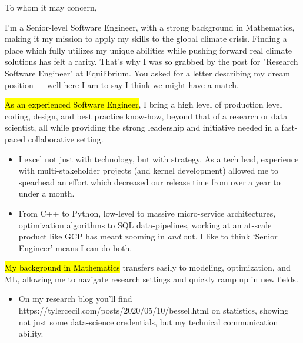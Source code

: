\documentclass{tc_cv}
\begin{document}

\begin{adjustwidth}{38pt}{38pt}
  \large

  To whom it may concern,\par \medbreak

  \medbreak

  I'm a Senior-level Software Engineer, with a strong background in
  Mathematics, making it my mission to apply my skills to the global climate
  crisis. Finding a place which fully utilizes my unique abilities while
  pushing forward real climate solutions has felt a rarity. That's why I was so
  grabbed by the post for "Research Software Engineer" at Equilibrium. You
  asked for a letter describing my dream position --- well here I am to say I
  think we might have a match. \medbreak

  \hl{As an experienced Software Engineer}, I bring a high level of production
  level coding, design, and best practice know-how, beyond that of a research
  or data scientist, all while providing the strong leadership and initiative
  needed in a fast-paced collaborative setting.
  \begin{itemize}

    \item I excel not just with technology, but with strategy. As a tech lead,
      experience with multi-stakeholder projects (and kernel development)
      allowed me to spearhead an effort which decreased our release time from
      over a year to under a month.

    \item From C++ to Python, low-level to massive micro-service architectures,
      optimization algorithms to SQL data-pipelines, working at an at-scale
      product like GCP has meant zooming in \emph{and} out. I like to think
      `Senior Engineer' means I can do both.

  \end{itemize} \medbreak

  \hl{My background in Mathematics} transfers easily to modeling, optimization,
  and ML, allowing me to navigate research settings and quickly ramp up in new
  fields.
  \begin{itemize}

    \item On my research blog you'll find \cite{Jupyter
      notebooks}{https://tylercecil.com/posts/2020/05/10/bessel.html} on
      statistics, showing not just some data-science credentials, but my
      technical communication ability.


\end{itemize}
\end{adjustwidth}
\end{document}
